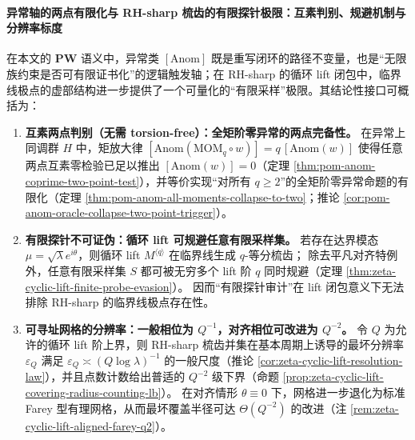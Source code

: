 \paragraph{异常轴的两点有限化与 RH-sharp 梳齿的有限探针极限：互素判别、规避机制与分辨率标度}
在本文的 \(\mathbf{PW}\) 语义中，异常类 \([\mathrm{Anom}]\) 既是重写闭环的路径不变量，也是“无限族约束是否可有限证书化”的逻辑触发轴；在 RH-sharp 的循环 lift 闭包中，临界线极点的虚部结构进一步提供了一个可量化的“有限采样”极限。其结论性接口可概括为：
\begin{enumerate}
  \item \textbf{互素两点判别（无需 torsion-free）：全矩阶零异常的两点完备性。}
  在异常上同调群 \(H\) 中，矩放大律
  \(
  [\mathrm{Anom}(\mathrm{MOM}_q\circ w)]=q\,[\mathrm{Anom}(w)]
  \)
  使得任意两点互素零检验已足以推出 \([\mathrm{Anom}(w)]=0\)（定理 \ref{thm:pom-anom-coprime-two-point-test}），并等价实现“对所有 \(q\ge 2\)”的全矩阶零异常命题的有限化（定理 \ref{thm:pom-anom-all-moments-collapse-to-two}；推论 \ref{cor:pom-anom-oracle-collapse-two-point-trigger}）。

  \item \textbf{有限探针不可证伪：循环 lift 可规避任意有限采样集。}
  若存在达界模态 \(\mu=\sqrt{\lambda}e^{i\theta}\)，则循环 lift \(M^{\langle q\rangle}\) 在临界线生成 \(q\)-等分梳齿；
  除去平凡对齐特例外，任意有限采样集 \(S\) 都可被无穷多个 lift 阶 \(q\) 同时规避（定理 \ref{thm:zeta-cyclic-lift-finite-probe-evasion}）。
  因而“有限探针审计”在 lift 闭包意义下无法排除 RH-sharp 的临界线极点存在性。

  \item \textbf{可寻址网格的分辨率：一般相位为 \texorpdfstring{$Q^{-1}$}{Q^-1}，对齐相位可改进为 \texorpdfstring{$Q^{-2}$}{Q^-2}。}
  令 \(Q\) 为允许的循环 lift 阶上界，则 RH-sharp 梳齿并集在基本周期上诱导的最坏分辨率 \(\varepsilon_Q\) 满足
  \(
  \varepsilon_Q\asymp (Q\log\lambda)^{-1}
  \)
  的一般尺度（推论 \ref{cor:zeta-cyclic-lift-resolution-law}），并且点数计数给出普适的 \(Q^{-2}\) 级下界（命题 \ref{prop:zeta-cyclic-lift-covering-radius-counting-lb}）。
  在对齐情形 \(\theta\equiv 0\) 下，网格进一步退化为标准 Farey 型有理网格，从而最坏覆盖半径可达 \(\Theta(Q^{-2})\) 的改进（注 \ref{rem:zeta-cyclic-lift-aligned-farey-q2}）。
\end{enumerate}

